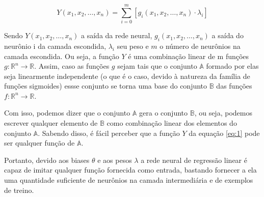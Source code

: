 \documentclass[a4paper, 12pt]{article}
\begin{document}
\begin{enumerate}
\begin{equation}
\label{eq:1}
Y(x_1, x_2, \ldots, x_n) = \sum_{i=0}^m\left[g_i(x_1, x_2, \ldots, x_n) \cdot \lambda_i  \right]
\end{equation}

Sendo $Y(x_1, x_2, \ldots, x_n)$ a saída da rede neural, $g_i(x_1, x_2, \ldots, x_n)$ a saída do neurônio i da camada escondida, $\lambda_i$ seu peso e $m$ o número de neurônios na camada escondida. Ou seja, a função $Y$ é uma combinação linear de m funções $g:\mathbb{R}^n \rightarrow \mathbb{R}$. Assim, caso as funções $g$ sejam tais que o conjunto $\mathbb{A}$ formado por elas seja linearmente independente (o que é o caso, devido à natureza da família de funções sigmoides) essse conjunto se torna uma base do conjunto $\mathbb{B}$ das funções $f:\mathbb{R}^n \rightarrow \mathbb{R}$.

Com isso, podemos dizer que o conjunto $\mathbb{A}$ gera o conjunto $\mathbb{B}$, ou seja, podemos escrever qualquer elemento de $\mathbb{B}$ como combinação linear dos elementos do conjunto $\mathbb{A}$. Sabendo disso, é fácil perceber que a função $Y$ da equação \ref{eq:1} pode ser qualquer função de $\mathbb{A}$.

Portanto, devido aos biases $\theta$ e aos pesos $\lambda$ a rede neural de regressão linear é capaz de imitar qualquer função fornecida como entrada, bastando fornecer a ela uma quantidade suficiente de neurônios na camada intermediária e de exemplos de treino.
\end{enumerate}
\end{document}
